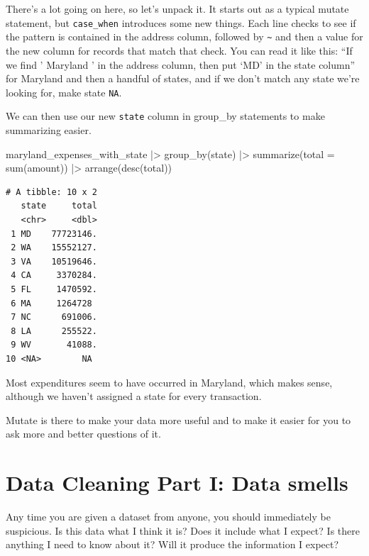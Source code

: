 \documentclass[
  letterpaper,
  DIV=11,
  numbers=noendperiod]{scrreprt}
\newenvironment{Shaded}{\begin{snugshade}}{\end{snugshade}}
\newcommand{\AttributeTok}[1]{\textcolor[rgb]{0.40,0.45,0.13}{#1}}
\newcommand{\FunctionTok}[1]{\textcolor[rgb]{0.28,0.35,0.67}{#1}}
\newcommand{\NormalTok}[1]{\textcolor[rgb]{0.00,0.23,0.31}{#1}}
\newcommand{\SpecialCharTok}[1]{\textcolor[rgb]{0.37,0.37,0.37}{#1}}
\begin{document}
There's a lot going on here, so let's unpack it. It starts out as a
typical mutate statement, but \texttt{case\_when} introduces some new
things. Each line checks to see if the pattern is contained in the
address column, followed by \texttt{\textasciitilde{}} and then a value
for the new column for records that match that check. You can read it
like this: ``If we find ' Maryland ' in the address column, then put
`MD' in the state column'' for Maryland and then a handful of states,
and if we don't match any state we're looking for, make state
\texttt{NA}.

We can then use our new \texttt{state} column in group\_by statements to
make summarizing easier.

\begin{Shaded}
\begin{Highlighting}[]
\NormalTok{maryland\_expenses\_with\_state }\SpecialCharTok{|\textgreater{}}
  \FunctionTok{group\_by}\NormalTok{(state) }\SpecialCharTok{|\textgreater{}}
  \FunctionTok{summarize}\NormalTok{(}\AttributeTok{total =} \FunctionTok{sum}\NormalTok{(amount)) }\SpecialCharTok{|\textgreater{}}
  \FunctionTok{arrange}\NormalTok{(}\FunctionTok{desc}\NormalTok{(total))}
\end{Highlighting}
\end{Shaded}

\begin{verbatim}
# A tibble: 10 x 2
   state     total
   <chr>     <dbl>
 1 MD    77723146.
 2 WA    15552127.
 3 VA    10519646.
 4 CA     3370284.
 5 FL     1470592.
 6 MA     1264728 
 7 NC      691006.
 8 LA      255522.
 9 WV       41088.
10 <NA>        NA 
\end{verbatim}

Most expenditures seem to have occurred in Maryland, which makes sense,
although we haven't assigned a state for every transaction.

Mutate is there to make your data more useful and to make it easier for
you to ask more and better questions of it.


\hypertarget{data-cleaning-part-i-data-smells}{%
\chapter{Data Cleaning Part I: Data
smells}\label{data-cleaning-part-i-data-smells}}

Any time you are given a dataset from anyone, you should immediately be
suspicious. Is this data what I think it is? Does it include what I
expect? Is there anything I need to know about it? Will it produce the
information I expect?
\end{document}
